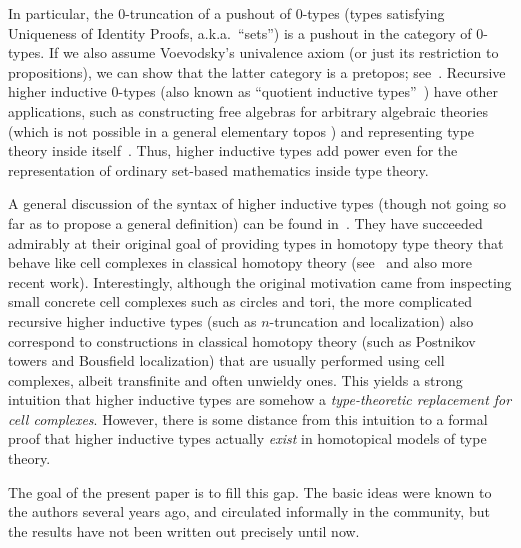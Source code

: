 \documentclass{amsart}
\begin{document}
In particular, the $0$-truncation of a pushout of $0$-types (types satisfying Uniqueness of Identity Proofs, a.k.a.\ ``sets'') is a pushout in the category of $0$-types.
If we also assume Voevodsky's univalence axiom (or just its restriction to propositions), we can show that the latter category is a pretopos; see~\cite[Chapter 10]{hottbook}.
Recursive higher inductive $0$-types (also known as ``quotient inductive types''~\cite{acdf:qiits}) have other applications, such as constructing free algebras for arbitrary algebraic theories (which is not possible in a general elementary topos \cite{blass:freealg}) and representing type theory inside itself~\cite{ak:tt-qit}.
Thus, higher inductive types add power even for the representation of ordinary set-based mathematics inside type theory.

A general discussion of the syntax of higher inductive types (though not going so far as to propose a general definition) can be found in~\cite[Chapter 6]{hottbook}.
They have succeeded admirably at their original goal of providing types in homotopy type theory that behave like cell complexes in classical homotopy theory (see~\cite[Chapter 8]{hottbook} and also more recent work).
Interestingly, although the original motivation came from inspecting small concrete cell complexes such as circles and tori, the more complicated recursive higher inductive types (such as $n$-truncation and localization) also correspond to constructions in classical homotopy theory (such as Postnikov towers and Bousfield localization) that are usually performed using cell complexes, albeit transfinite and often unwieldy ones.
This yields a strong intuition that higher inductive types are somehow a \emph{type-theoretic replacement for cell complexes}.
However, there is some distance from this intuition to a formal proof that higher inductive types actually \emph{exist} in homotopical models of type theory.

The goal of the present paper is to fill this gap.
The basic ideas were known to the authors several years ago, and circulated informally in the community, but the results have not been written out precisely until now.
\end{document}
